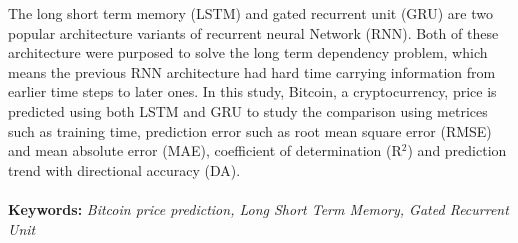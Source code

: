 The long short term memory (LSTM) and gated recurrent unit (GRU) are two popular architecture variants of recurrent neural Network (RNN). Both of these architecture were purposed to solve the long term dependency problem, which means the previous RNN architecture had hard time carrying information from earlier time steps to later ones. In this study, Bitcoin, a cryptocurrency, price is predicted using both LSTM and GRU to study the comparison using metrices such as training time, prediction error such as root mean square error (RMSE) and mean absolute error (MAE), coefficient of determination (R$^2$) and prediction trend with directional accuracy (DA).
\\\\
\textbf{Keywords:} \textit{Bitcoin price prediction, Long Short Term Memory, Gated Recurrent Unit}